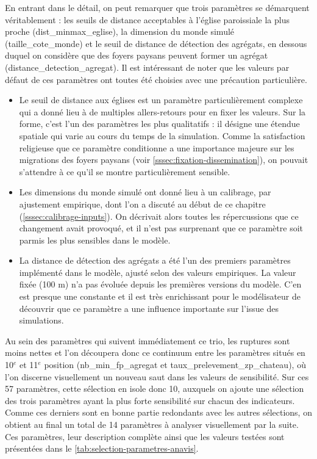 En entrant dans le détail, on peut remarquer que trois paramètres se démarquent véritablement : les seuils de distance acceptables à l'église paroissiale la plus proche (\textsf{dist\_minmax\_eglise}), la dimension du monde simulé (\textsf{taille\_cote\_monde}) et le seuil de distance de détection des agrégats, en dessous duquel on considère que des foyers paysans peuvent former un agrégat (\textsf{distance\_detection\_agregat}).
Il est intéressant de noter que les valeurs par défaut de ces paramètres ont toutes été choisies avec une précaution particulière.
\begin{itemize}
	\item Le seuil de distance aux églises est un paramètre particulièrement complexe qui a donné lieu à de multiples allers-retours pour en fixer les valeurs.
	Sur la forme, c'est l'un des paramètres les plus \og qualitatifs\fg{} : il désigne une étendue spatiale qui varie au cours du temps de la simulation.
	Comme la satisfaction religieuse que ce paramètre conditionne a une importance majeure sur les migrations des foyers paysans (voir \cref{sssec:fixation-dissemination}), on pouvait s'attendre à ce qu'il se montre particulièrement sensible.
	\item Les dimensions du monde simulé ont donné lieu à un calibrage, par ajustement empirique, dont l'on a discuté au début de ce chapitre (\cref{sssec:calibrage-inputs}).
	On décrivait alors toutes les répercussions que ce changement avait provoqué, et il n'est pas surprenant que ce paramètre soit parmis les plus sensibles dans le modèle.
	\item La distance de détection des agrégats a été l'un des premiers paramètres implémenté dans le modèle, ajusté selon des valeurs empiriques.
	La valeur fixée (100 m) n'a pas évoluée depuis les premières versions du modèle.
	C'en est presque une constante et il est très enrichissant pour le modélisateur de découvrir que ce paramètre a une influence importante sur l'issue des simulations.
\end{itemize}

Au sein des paramètres qui suivent immédiatement ce trio, les ruptures sont moins nettes et l'on découpera donc ce continuum entre les paramètres situés en 10$^e$ et 11$^e$ position (\textsf{nb\_min\_fp\_agregat} et \textsf{taux\_prelevement\_zp\_chateau}), où l'on discerne visuellement un nouveau saut dans les valeurs de sensibilité.
Sur ces 57 paramètres, cette sélection en isole donc 10, auxquels on ajoute une sélection des trois paramètres ayant la plus forte sensibilité sur chacun des indicateurs.
Comme ces derniers sont en bonne partie redondants avec les autres sélections, on obtient au final un total de 14 paramètres à analyser visuellement par la suite.
Ces paramètres, leur description complète ainsi que les valeurs testées sont présentées dans le \cref{tab:selection-parametres-anavis}.

